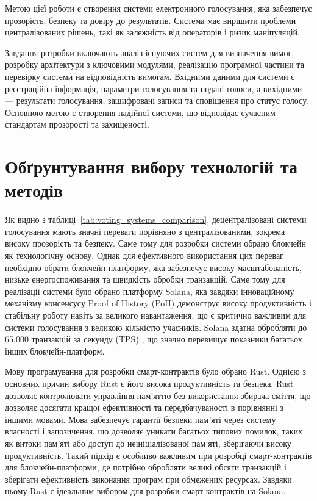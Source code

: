 \documentclass[14pt]{extreport}
\begin{document}
  Метою цієї роботи є створення системи електронного голосування, яка забезпечує прозорість, безпеку та довіру до результатів. Система має вирішити проблеми централізованих рішень, такі як залежність від операторів і ризик маніпуляцій.

  Завдання розробки включають аналіз існуючих систем для визначення вимог, розробку архітектури з ключовими модулями, реалізацію програмної частини та перевірку системи на відповідність вимогам. Вхідними даними для системи є реєстраційна інформація, параметри голосування та подані голоси, а вихідними — результати голосування, зашифровані записи та сповіщення про статус голосу. Основною метою є створення надійної системи, що відповідає сучасним стандартам прозорості та захищеності.
  
  \section{Обґрунтування вибору технологій та методів}
  
  Як видно з таблиці~\ref{tab:voting_systems_comparison}, децентралізовані системи голосування мають значні переваги порівняно з централізованими, зокрема високу прозорість та безпеку. Саме тому для розробки системи обрано блокчейн як технологічну основу. Однак для ефективного використання цих переваг необхідно обрати блокчейн-платформу, яка забезпечує високу масштабованість, низьке енергоспоживання та швидкість обробки транзакцій. Саме тому для реалізації системи було обрано платформу Solana, яка завдяки інноваційному механізму консенсусу Proof of History (PoH) демонструє високу продуктивність і стабільну роботу навіть за великого навантаження, що є критично важливим для системи голосування з великою кількістю учасників. Solana здатна обробляти до 65,000 транзакцій за секунду (TPS) \cite{solana_report}, що значно перевищує показники багатьох інших блокчейн-платформ.

  Мову програмування для розробки смарт-контрактів було обрано Rust. Однією з основних причин вибору Rust є його висока продуктивність та безпека. Rust дозволяє контролювати управління пам'яттю без використання збирача сміття, що дозволяє досягати кращої ефективності та передбачуваності в порівнянні з іншими мовами. Мова забезпечує гарантії безпеки пам'яті через систему власності і запозичення, що дозволяє уникати багатьох типових помилок, таких як витоки пам'яті або доступ до неініціалізованої пам'яті, зберігаючи високу продуктивність. Такий підхід є особливо важливим при розробці смарт-контрактів для блокчейн-платформи, де потрібно обробляти великі обсяги транзакцій і зберігати ефективність виконання програм при обмежених ресурсах. Завдяки цьому Rust є ідеальним вибором для розробки смарт-контрактів на Solana.
\end{document}

